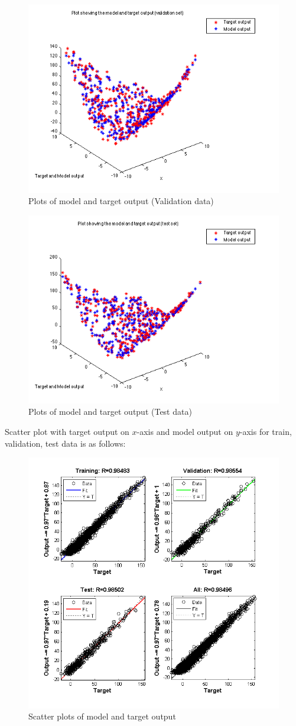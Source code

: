 \documentclass{article}
\begin{document}
\begin{figure}[H]
\centering
\includegraphics[width=0.5\linewidth]{Regression/bivariate/output_1layer_val.png}
\caption{Plots of model and target output (Validation data)}
\end{figure}

\begin{figure}[H]
\centering
\includegraphics[width=0.5\linewidth]{Regression/bivariate/output_1layer_test.png}
\caption{Plots of model and target output (Test data)}
\end{figure}

Scatter plot with target output on $x$-axis and model output on $y$-axis for train, validation, test data is as follows:

\begin{figure}[H]
\centering
\includegraphics[width=\linewidth]{Regression/bivariate/scatter_1layer.png}
\caption{Scatter plots of model and target output}
\end{figure}
\end{document}
